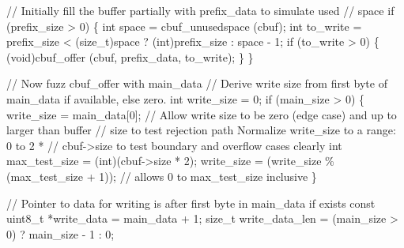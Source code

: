 \documentclass[
  a4paper,
]{scrreprt}
\newenvironment{Shaded}{\begin{snugshade}}{\end{snugshade}}
\newcommand{\CommentTok}[1]{\textcolor[rgb]{0.41,0.41,0.41}{#1}}
\newcommand{\ControlFlowTok}[1]{\textcolor[rgb]{0.85,0.12,0.09}{#1}}
\newcommand{\DataTypeTok}[1]{\textcolor[rgb]{0.47,0.16,0.63}{#1}}
\newcommand{\DecValTok}[1]{\textcolor[rgb]{0.47,0.16,0.63}{#1}}
\newcommand{\NormalTok}[1]{\textcolor[rgb]{0.33,0.33,0.33}{#1}}
\newcommand{\OperatorTok}[1]{\textcolor[rgb]{0.00,0.46,0.62}{#1}}
\theoremstyle{definition}
\theoremstyle{remark}
\begin{document}
\begin{Shaded}
\begin{Highlighting}[numbers=left,,]
  \CommentTok{// Initially fill the buffer partially with prefix\_data to simulate used}
  \CommentTok{// space}
  \ControlFlowTok{if} \OperatorTok{(}\NormalTok{prefix\_size }\OperatorTok{\textgreater{}} \DecValTok{0}\OperatorTok{)}
    \OperatorTok{\{}
      \DataTypeTok{int}\NormalTok{ space }\OperatorTok{=}\NormalTok{ cbuf\_unusedspace }\OperatorTok{(}\NormalTok{cbuf}\OperatorTok{);}
      \DataTypeTok{int}\NormalTok{ to\_write}
          \OperatorTok{=}\NormalTok{ prefix\_size }\OperatorTok{\textless{}} \OperatorTok{(}\DataTypeTok{size\_t}\OperatorTok{)}\NormalTok{space }\OperatorTok{?} \OperatorTok{(}\DataTypeTok{int}\OperatorTok{)}\NormalTok{prefix\_size }\OperatorTok{:}\NormalTok{ space }\OperatorTok{{-}} \DecValTok{1}\OperatorTok{;}
      \ControlFlowTok{if} \OperatorTok{(}\NormalTok{to\_write }\OperatorTok{\textgreater{}} \DecValTok{0}\OperatorTok{)}
        \OperatorTok{\{}
          \OperatorTok{(}\DataTypeTok{void}\OperatorTok{)}\NormalTok{cbuf\_offer }\OperatorTok{(}\NormalTok{cbuf}\OperatorTok{,}\NormalTok{ prefix\_data}\OperatorTok{,}\NormalTok{ to\_write}\OperatorTok{);}
        \OperatorTok{\}}
    \OperatorTok{\}}

  \CommentTok{// Now fuzz cbuf\_offer with main\_data}
  \CommentTok{// Derive write size from first byte of main\_data if available, else zero.}
  \DataTypeTok{int}\NormalTok{ write\_size }\OperatorTok{=} \DecValTok{0}\OperatorTok{;}
  \ControlFlowTok{if} \OperatorTok{(}\NormalTok{main\_size }\OperatorTok{\textgreater{}} \DecValTok{0}\OperatorTok{)}
    \OperatorTok{\{}
\NormalTok{      write\_size }\OperatorTok{=}\NormalTok{ main\_data}\OperatorTok{[}\DecValTok{0}\OperatorTok{];}
      \CommentTok{// Allow write size to be zero (edge case) and up to larger than buffer}
      \CommentTok{// size to test rejection path Normalize write\_size to a range: 0 to 2 *}
      \CommentTok{// cbuf{-}\textgreater{}size to test boundary and overflow cases clearly}
      \DataTypeTok{int}\NormalTok{ max\_test\_size }\OperatorTok{=} \OperatorTok{(}\DataTypeTok{int}\OperatorTok{)(}\NormalTok{cbuf}\OperatorTok{{-}\textgreater{}}\NormalTok{size }\OperatorTok{*} \DecValTok{2}\OperatorTok{);}
\NormalTok{      write\_size}
          \OperatorTok{=} \OperatorTok{(}\NormalTok{write\_size}
             \OperatorTok{\%} \OperatorTok{(}\NormalTok{max\_test\_size }\OperatorTok{+} \DecValTok{1}\OperatorTok{));} \CommentTok{// allows 0 to max\_test\_size inclusive}
    \OperatorTok{\}}

  \CommentTok{// Pointer to data for writing is after first byte in main\_data if exists}
  \DataTypeTok{const} \DataTypeTok{uint8\_t} \OperatorTok{*}\NormalTok{write\_data }\OperatorTok{=}\NormalTok{ main\_data }\OperatorTok{+} \DecValTok{1}\OperatorTok{;}
  \DataTypeTok{size\_t}\NormalTok{ write\_data\_len }\OperatorTok{=} \OperatorTok{(}\NormalTok{main\_size }\OperatorTok{\textgreater{}} \DecValTok{0}\OperatorTok{)} \OperatorTok{?}\NormalTok{ main\_size }\OperatorTok{{-}} \DecValTok{1} \OperatorTok{:} \DecValTok{0}\OperatorTok{;}


\end{Highlighting}
\end{Shaded}
\end{document}
